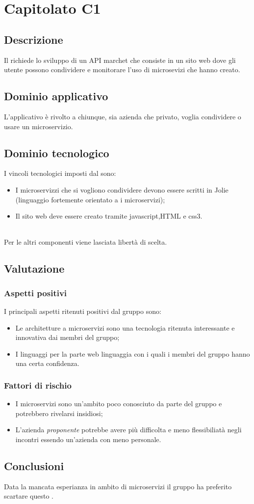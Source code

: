 \documentclass[../StudioDiFattibilita.tex]{subfiles}
\begin{document}
	\section{Capitolato C1}
		\subsection{Descrizione}
		Il  richiede lo sviluppo di un API marchet che consiste in un sito web dove gli utente possono condividere e monitorare l'uso di microsevizi che hanno creato.
		\subsection{Dominio applicativo}
		L'applicativo è rivolto a chiunque, sia azienda che privato, voglia condividere o usare un microservizio.
		\subsection{Dominio tecnologico} 
		I vincoli tecnologici imposti dal  sono:
				\begin{itemize}
			\item I microservizzi che si vogliono condividere devono essere scritti in Jolie (linguaggio fortemente orientato a i microservizi);
	\item	Il sito web deve essere creato tramite javascript,HTML e css3.
		\end{itemize}
		\\ Per le altri componenti viene lasciata libertà di scelta.
		\subsection{Valutazione}
			\subsubsection{Aspetti positivi}
			I principali aspetti ritenuti positivi dal gruppo sono:
				\begin{itemize}
				\item Le architetture a microservizi sono una tecnologia ritenuta interessante e innovativa dai membri del gruppo; 
				\item I linguaggi per la parte web linguaggia con i quali i membri del gruppo hanno una certa confidenza.
			\end{itemize}
			\subsubsection{Fattori di rischio}
				\begin{itemize}
				\item I microservizi sono un'ambito poco conosciuto da parte del gruppo e potrebbero rivelarsi insidiosi;
				\item L'azienda \textit{proponente} potrebbe avere più difficolta e meno flessibiliatà negli incontri essendo un'azienda con meno personale.
			\end{itemize}
			\subsection{Conclusioni}
			Data la mancata esperianza in ambito di microservizi il gruppo ha preferito scartare questo .
\end{document}
